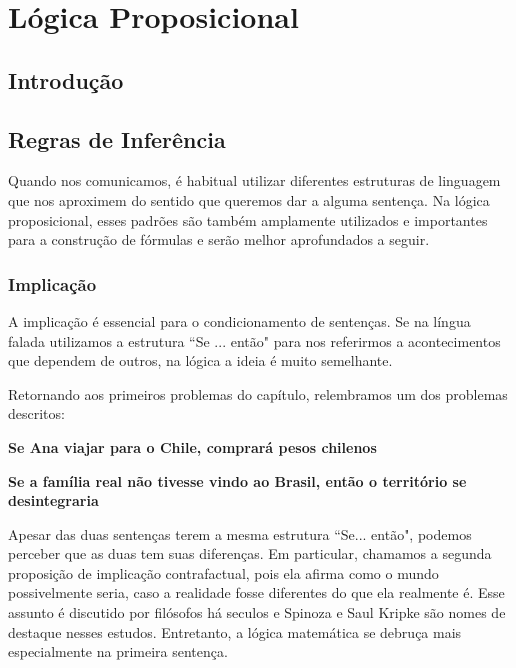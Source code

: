 \chapter{Lógica Proposicional}
\section{Introdução}

\section{Regras de Inferência}
Quando nos comunicamos, é habitual utilizar diferentes estruturas de linguagem que nos aproximem do sentido que queremos dar a alguma sentença. Na lógica proposicional, esses padrões são também amplamente utilizados e importantes para a construção de fórmulas e serão melhor aprofundados a seguir.

\subsection{Implicação} 
A implicação é essencial para o condicionamento de sentenças. Se na língua falada utilizamos a estrutura ``Se ... então"  para nos referirmos a acontecimentos que dependem de outros, na lógica a ideia é muito semelhante.

Retornando aos primeiros problemas do capítulo, relembramos um dos problemas descritos: %
\begin{center}
\textbf{Se Ana viajar para o Chile, comprará pesos chilenos}

\textbf{Se a família real não tivesse vindo ao Brasil, então o território se desintegraria}
\end{center}

Apesar das duas sentenças terem a mesma estrutura ``Se... então", podemos perceber que as duas tem suas diferenças. Em particular, chamamos a segunda proposição de implicação contrafactual, pois ela afirma como o mundo possivelmente seria, caso a realidade fosse diferentes do que ela realmente é. Esse assunto é discutido por filósofos há seculos e Spinoza e Saul Kripke são nomes de destaque nesses estudos. Entretanto, a lógica matemática se debruça mais especialmente na primeira sentença.

